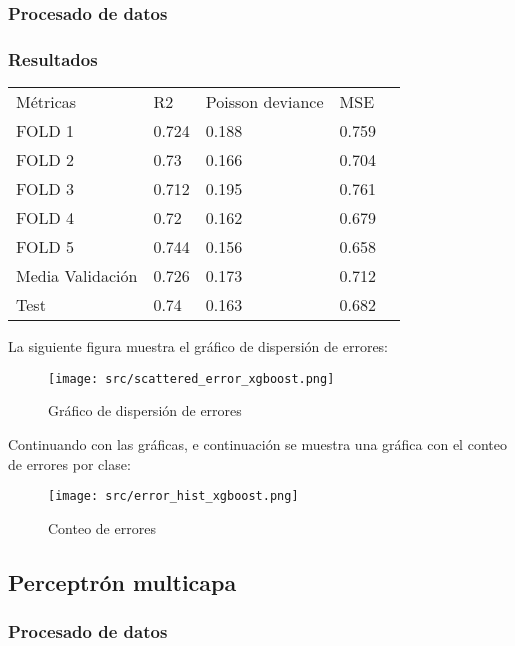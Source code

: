 \subsubsection{Procesado de datos}
\subsubsection{Resultados}
\begin{table}[H]
	 \centering
	\begin{tabular}{|l|l|l|l|l}
		\cline{1-4}
		Métricas         &	 R2  & Poisson deviance & MSE   \\ \cline{1-4}
		FOLD 1           & 0.724 & 0.188            & 0.759 \\ \cline{1-4}
		FOLD 2           & 0.73  & 0.166            & 0.704 \\ \cline{1-4}
		FOLD 3           & 0.712 & 0.195            & 0.761 \\ \cline{1-4}
		FOLD 4           & 0.72  & 0.162            & 0.679 \\ \cline{1-4}
		FOLD 5           & 0.744 & 0.156            & 0.658 \\ \cline{1-4}
		Media Validación & 0.726 & 0.173            & 0.712 \\ \cline{1-4}
		Test             & 0.74  & 0.163            & 0.682 \\ \cline{1-4}
	\end{tabular}
\end{table}
La siguiente figura muestra el gráfico de dispersión de errores:
\begin{figure}[H]
	\centering
	\texttt{[image: src/scattered\_error\_xgboost.png]}
	\caption{Gráfico de dispersión de errores}
	\label{fig:xgboost_scattered}
\end{figure}
Continuando con las gráficas, e continuación se muestra una gráfica con el conteo de errores por clase:\\
\linebreak
\begin{figure}[H]
	\centering
	\texttt{[image: src/error\_hist\_xgboost.png]}
	\caption{Conteo de errores}
	\label{fig:xgboost_error_plot}
\end{figure}
\subsection{Perceptrón multicapa}
\subsubsection{Procesado de datos}
